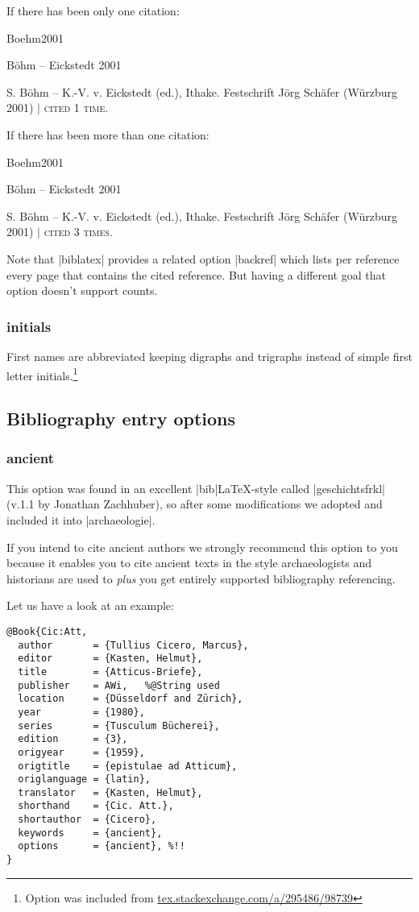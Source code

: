 \documentclass[a4paper,
10pt,
greek,
french,
spanish,
italian,
ngerman,
english
]{ltxdoc}
\begin{document}
If there has been only one citation:
\begin{bibbsp}{Boehm2001}
\parbox[t]{3cm}{Böhm – Eickstedt 2001} \parbox[t]{8cm}{%
S. Böhm – K.-V. v. Eickstedt (ed.), Ithake. Festschrift Jörg Schäfer (Würzburg 2001) $\vert$  {\scshape cited 1 time.}}
\end{bibbsp}

If there has been more than one citation:
\begin{bibbsp}{Boehm2001}
\parbox[t]{3cm}{Böhm – Eickstedt 2001} \parbox[t]{8cm}{%
S. Böhm – K.-V. v. Eickstedt (ed.), Ithake. Festschrift Jörg Schäfer (Würzburg 2001) $\vert$  {\scshape cited 3 times.}}
\end{bibbsp}

Note that |biblatex| provides a related option |backref| which lists per reference every page 
that contains the cited reference. But having a different goal that option doesn't support counts. 
 
\subsubsection{initials}\label{initials}
First names are abbreviated keeping digraphs and trigraphs instead of simple first letter initials.\footnote{Option was included from \href{http://tex.stackexchange.com/a/295486/98739}{tex.stackexchange.com/a/295486/98739}}

\subsection{Bibliography entry options}\label{options-bibentry}
\subsubsection{ancient}\label{ancient}
This option was found in an excellent |bib|\LaTeX-style called  |geschichtsfrkl| (v.1.1 by Jonathan Zachhuber), 
so after some modifications we adopted and included it into |archaeologie|.
 
If you intend to cite ancient authors we strongly recommend this option to you 
because it enables you to cite ancient texts in the style archaeologists and 
historians are used to \emph{plus} you get entirely supported bibliography referencing.

Let us have a look at an example:
\begin{lstlisting}[style=bibentry,label=Cic:Att,caption={{@}Book\{Cic:Att,…\} }]
@Book{Cic:Att,
  author       = {Tullius Cicero, Marcus},
  editor       = {Kasten, Helmut},
  title        = {Atticus-Briefe},
  publisher    = AWi, 	%@String used
  location     = {Düsseldorf and Zürich},
  year         = {1980},
  series       = {Tusculum Bücherei},
  edition      = {3},
  origyear     = {1959},
  origtitle    = {epistulae ad Atticum},
  origlanguage = {latin},
  translator   = {Kasten, Helmut},
  shorthand    = {Cic. Att.},
  shortauthor  = {Cicero},
  keywords     = {ancient},
  options      = {ancient}, %!!
}
\end{lstlisting}
\end{document}
